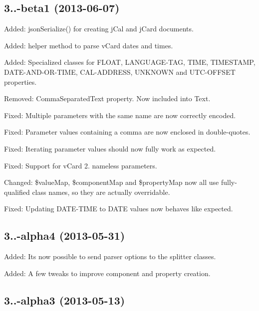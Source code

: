 \subsection*{3..-\/beta1 (2013-\/06-\/07) }


\begin{DoxyItemize}
\item Added\+: json\+Serialize() for creating j\+Cal and j\+Card documents.
\item Added\+: helper method to parse v\+Card dates and times.
\item Added\+: Specialized classes for F\+L\+O\+AT, L\+A\+N\+G\+U\+A\+G\+E-\/\+T\+AG, T\+I\+ME, T\+I\+M\+E\+S\+T\+A\+MP, D\+A\+T\+E-\/\+A\+N\+D-\/\+O\+R-\/\+T\+I\+ME, C\+A\+L-\/\+A\+D\+D\+R\+E\+SS, U\+N\+K\+N\+O\+WN and U\+T\+C-\/\+O\+F\+F\+S\+ET properties.
\item Removed\+: Comma\+Separated\+Text property. Now included into Text.
\item Fixed\+: Multiple parameters with the same name are now correctly encoded.
\item Fixed\+: Parameter values containing a comma are now enclosed in double-\/quotes.
\item Fixed\+: Iterating parameter values should now fully work as expected.
\item Fixed\+: Support for v\+Card 2. nameless parameters.
\item Changed\+: \$value\+Map, \$component\+Map and \$property\+Map now all use fully-\/qualified class names, so they are actually overridable.
\item Fixed\+: Updating D\+A\+T\+E-\/\+T\+I\+ME to D\+A\+TE values now behaves like expected.
\end{DoxyItemize}

\subsection*{3..-\/alpha4 (2013-\/05-\/31) }


\begin{DoxyItemize}
\item Added\+: It\textquotesingle{}s now possible to send parser options to the splitter classes.
\item Added\+: A few tweaks to improve component and property creation.
\end{DoxyItemize}

\subsection*{3..-\/alpha3 (2013-\/05-\/13) }



